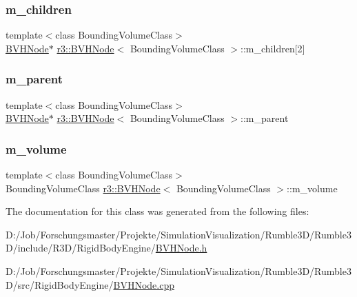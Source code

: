 \subsubsection{\texorpdfstring{m\+\_\+children}{m\_children}}
{\footnotesize\ttfamily template$<$class Bounding\+Volume\+Class$>$ \\
\mbox{\hyperlink{classr3_1_1_b_v_h_node}{B\+V\+H\+Node}}$\ast$ \mbox{\hyperlink{classr3_1_1_b_v_h_node}{r3\+::\+B\+V\+H\+Node}}$<$ Bounding\+Volume\+Class $>$\+::m\+\_\+children\mbox{[}2\mbox{]}\hspace{0.3cm}{\ttfamily [protected]}}

\mbox{\label{classr3_1_1_b_v_h_node_a62424473dd79cf59262a6a53995b0e26}} 
\subsubsection{\texorpdfstring{m\+\_\+parent}{m\_parent}}
{\footnotesize\ttfamily template$<$class Bounding\+Volume\+Class$>$ \\
\mbox{\hyperlink{classr3_1_1_b_v_h_node}{B\+V\+H\+Node}}$\ast$ \mbox{\hyperlink{classr3_1_1_b_v_h_node}{r3\+::\+B\+V\+H\+Node}}$<$ Bounding\+Volume\+Class $>$\+::m\+\_\+parent\hspace{0.3cm}{\ttfamily [protected]}}

\mbox{\label{classr3_1_1_b_v_h_node_a114366b1f5cbb56f6f650f9c794258a7}} 
\subsubsection{\texorpdfstring{m\+\_\+volume}{m\_volume}}
{\footnotesize\ttfamily template$<$class Bounding\+Volume\+Class$>$ \\
Bounding\+Volume\+Class \mbox{\hyperlink{classr3_1_1_b_v_h_node}{r3\+::\+B\+V\+H\+Node}}$<$ Bounding\+Volume\+Class $>$\+::m\+\_\+volume\hspace{0.3cm}{\ttfamily [protected]}}



The documentation for this class was generated from the following files\+:\begin{DoxyCompactItemize}
\item 
D\+:/\+Job/\+Forschungsmaster/\+Projekte/\+Simulation\+Visualization/\+Rumble3\+D/\+Rumble3\+D/include/\+R3\+D/\+Rigid\+Body\+Engine/\mbox{\hyperlink{_b_v_h_node_8h}{B\+V\+H\+Node.\+h}}\item 
D\+:/\+Job/\+Forschungsmaster/\+Projekte/\+Simulation\+Visualization/\+Rumble3\+D/\+Rumble3\+D/src/\+Rigid\+Body\+Engine/\mbox{\hyperlink{_b_v_h_node_8cpp}{B\+V\+H\+Node.\+cpp}}\end{DoxyCompactItemize}
